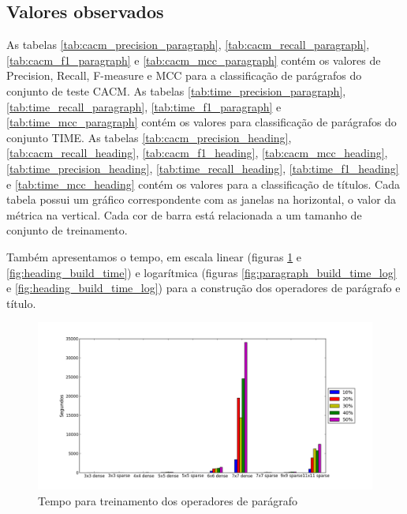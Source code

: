 \documentclass[a4paper,11pt]{article}
\begin{document}
  \subsection{Valores observados}

  As tabelas \ref{tab:cacm_precision_paragraph}, \ref{tab:cacm_recall_paragraph}, \ref{tab:cacm_f1_paragraph} e \ref{tab:cacm_mcc_paragraph} contém os valores de Precision, Recall, F-measure e MCC para a classificação de parágrafos do conjunto de teste CACM. As tabelas \ref{tab:time_precision_paragraph}, \ref{tab:time_recall_paragraph}, \ref{tab:time_f1_paragraph} e \ref{tab:time_mcc_paragraph} contém os valores para classificação de parágrafos do conjunto TIME. As tabelas \ref{tab:cacm_precision_heading}, \ref{tab:cacm_recall_heading}, \ref{tab:cacm_f1_heading}, \ref{tab:cacm_mcc_heading}, \ref{tab:time_precision_heading}, \ref{tab:time_recall_heading}, \ref{tab:time_f1_heading} e \ref{tab:time_mcc_heading} contém os valores para a classificação de títulos. Cada tabela possui um gráfico correspondente com as janelas na horizontal, o valor da métrica na vertical. Cada cor de barra está relacionada a um tamanho de conjunto de treinamento.

  Também apresentamos o tempo, em escala linear (figuras \ref{fig:paragraph_build_time} e \ref{fig:heading_build_time}) e logarítmica (figuras \ref{fig:paragraph_build_time_log} e \ref{fig:heading_build_time_log}) para a construção dos operadores de parágrafo e título.

  \begin{figure}[p]
    \centerline{\includegraphics[width=1.2\textwidth]{assets/experiment_charts/TextRegion_paragraph_time.png}}
    \caption{Tempo para treinamento dos operadores de parágrafo}
    \label{fig:paragraph_build_time}
  \end{figure}
\end{document}
